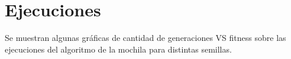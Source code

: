 \documentclass[9pt,conference]{IEEEtran}
\begin{document}


	\section{Ejecuciones}
Se muestran algunas gr\'aficas de cantidad de generaciones VS fitness sobre las ejecuciones del algoritmo de la mochila para distintas semillas.
\end{document}
